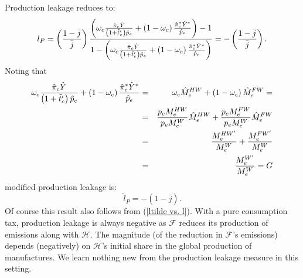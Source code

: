 \documentclass[notitlepage,12pt]{article}
\begin{document}
Production leakage reduces to:%
\begin{equation*}
l_{P}=\left( \frac{1-\bar{j}}{\bar{j}}\right) \frac{\left( \omega _{c}\frac{%
\hat{\pi}_{c}\hat{Y}}{\left( 1+\tilde{t}_{c}^{\prime }\right) \hat{p}_{e}}%
+\left( 1-\omega _{c}\right) \frac{\hat{\pi}_{c}^{\ast }\hat{Y}^{\ast }}{%
\hat{p}_{e}}\right) -1}{1-\left( \omega _{c}\frac{\hat{\pi}_{c}\hat{Y}}{%
\left( 1+\tilde{t}_{c}^{\prime }\right) \hat{p}_{e}}+\left( 1-\omega
_{c}\right) \frac{\hat{\pi}_{c}^{\ast }\hat{Y}^{\ast }}{\hat{p}_{e}}\right) }%
=-\left( \frac{1-\bar{j}}{\bar{j}}\right) .
\end{equation*}%
Noting that 
\begin{eqnarray*}
\omega _{c}\frac{\hat{\pi}_{c}\hat{Y}}{\left( 1+\tilde{t}_{c}^{\prime
}\right) \hat{p}_{e}}+\left( 1-\omega _{c}\right) \frac{\hat{\pi}_{c}^{\ast }%
\hat{Y}^{\ast }}{\hat{p}_{e}} &=&\omega _{c}\hat{M}_{e}^{HW}+\left( 1-\omega
_{c}\right) \hat{M}_{e}^{FW}= \\
&=&\frac{p_{e}M_{e}^{HW}}{p_{e}M_{e}^{W}}\hat{M}_{e}^{HW}+\frac{%
p_{e}M_{e}^{FW}}{p_{e}M_{e}^{W}}\hat{M}_{e}^{FW} \\
&=&\frac{M_{e}^{HW^{\prime }}}{M_{e}^{W}}+\frac{M_{e}^{FW^{\prime }}}{%
M_{e}^{W}} \\
&=&\frac{M_{e}^{W^{\prime }}}{M_{e}^{W}}=G
\end{eqnarray*}%
modified production leakage is:%
\begin{equation*}
\tilde{l}_{P}=-\left( 1-\bar{j}\right) .
\end{equation*}%
Of course this result also follows from (\ref{ltilde vs. l}). With a pure
consumption tax, production leakage is always negative as $\mathcal{F}$
reduces its production of emissions along with $\mathcal{H}$. The magnitude
(of the reduction in $\mathcal{F}$'s emissions) depends (negatively) on $%
\mathcal{H}$'s initial share in the global production of manufactures. We
learn nothing new from the production leakage measure in this setting.
\end{document}
